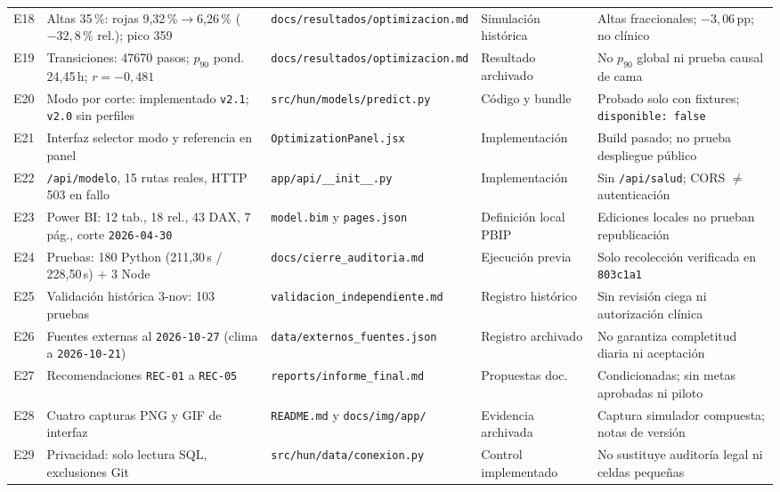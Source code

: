 {\begin{longtable}{@{}L{0.05\textwidth} L{0.25\textwidth} L{0.25\textwidth} L{0.15\textwidth} L{0.24\textwidth}@{}}
E18 & Altas 35\,\%: rojas 9,32\,\%$\rightarrow$6,26\,\% ($-32{,}8\,\%$ rel.); pico 359 & \nolinkurl{docs/resultados/optimizacion.md} & Simulación histórica & Altas fraccionales; $-3{,}06$\,pp; no clínico \\
E19 & Transiciones: \num{47670} pasos; $p_{90}$ pond. 24,45\,h; $r=-0{,}481$ & \nolinkurl{docs/resultados/optimizacion.md} & Resultado archivado & No $p_{90}$ global ni prueba causal de cama \\
E20 & Modo por corte: implementado \texttt{v2.1}; \texttt{v2.0} sin perfiles & \nolinkurl{src/hun/models/predict.py} & Código y bundle & Probado solo con fixtures; \texttt{disponible: false} \\
E21 & Interfaz selector modo y referencia en panel & \nolinkurl{OptimizationPanel.jsx} & Implementación & Build pasado; no prueba despliegue público \\
E22 & \texttt{/api/modelo}, 15 rutas reales, HTTP 503 en fallo & \nolinkurl{app/api/__init__.py} & Implementación & Sin \texttt{/api/salud}; CORS $\ne$ autenticación \\
E23 & Power BI: 12 tab., 18 rel., 43 DAX, 7 pág., corte \texttt{2026-04-30} & \nolinkurl{model.bim} y \nolinkurl{pages.json} & Definición local PBIP & Ediciones locales no prueban republicación \\
E24 & Pruebas: 180 Python (211,30\,s / 228,50\,s) + 3 Node & \nolinkurl{docs/cierre_auditoria.md} & Ejecución previa & Solo recolección verificada en \texttt{803c1a1} \\
E25 & Validación histórica 3-nov: 103 pruebas & \nolinkurl{validacion_independiente.md} & Registro histórico & Sin revisión ciega ni autorización clínica \\
E26 & Fuentes externas al \texttt{2026-10-27} (clima a \texttt{2026-10-21}) & \nolinkurl{data/externos_fuentes.json} & Registro archivado & No garantiza completitud diaria ni aceptación \\
E27 & Recomendaciones \texttt{REC-01} a \texttt{REC-05} & \nolinkurl{reports/informe_final.md} & Propuestas doc. & Condicionadas; sin metas aprobadas ni piloto \\
E28 & Cuatro capturas PNG y GIF de interfaz & \nolinkurl{README.md} y \nolinkurl{docs/img/app/} & Evidencia archivada & Captura simulador compuesta; notas de versión \\
E29 & Privacidad: solo lectura SQL, exclusiones Git & \nolinkurl{src/hun/data/conexion.py} & Control implementado & No sustituye auditoría legal ni celdas pequeñas \\
\end{longtable}
}

